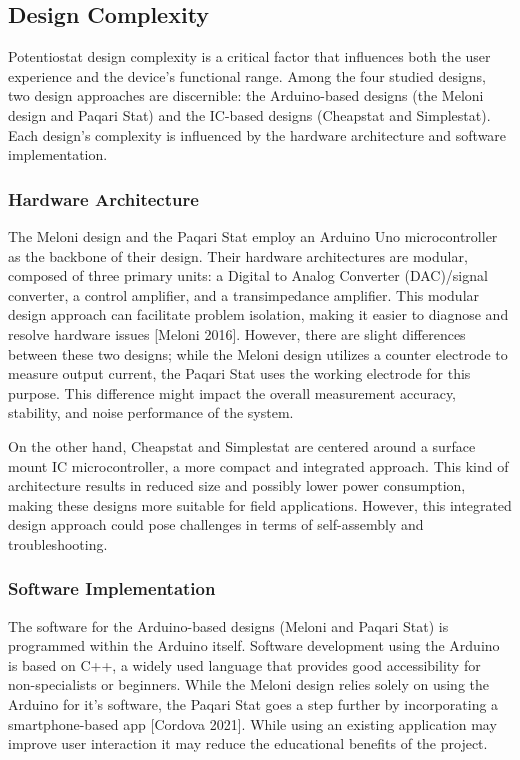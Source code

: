 \documentclass{article}
\begin{document}
\subsection*{Design Complexity}
Potentiostat design complexity is a critical factor that influences both the user experience and the device's functional range. Among the four studied designs, two design approaches are discernible: the Arduino-based designs (the Meloni design and Paqari Stat) and the IC-based designs (Cheapstat and Simplestat). Each design's complexity is influenced by the hardware architecture and software implementation.

\subsubsection*{Hardware Architecture}
The Meloni design and the Paqari Stat employ an Arduino Uno microcontroller as the backbone of their design. Their hardware architectures are modular, composed of three primary units: a Digital to Analog Converter (DAC)/signal converter, a control amplifier, and a transimpedance amplifier. This modular design approach can facilitate problem isolation, making it easier to diagnose and resolve hardware issues [Meloni 2016]. However, there are slight differences between these two designs; while the Meloni design utilizes a counter electrode to measure output current, the Paqari Stat uses the working electrode for this purpose. This difference might impact the overall measurement accuracy, stability, and noise performance of the system. 

On the other hand, Cheapstat and Simplestat are centered around a surface mount IC microcontroller, a more compact and integrated approach. This kind of architecture results in reduced size and possibly lower power consumption, making these designs more suitable for field applications. However, this integrated design approach could pose challenges in terms of self-assembly and troubleshooting.

\subsubsection*{Software Implementation}
The software for the Arduino-based designs (Meloni and Paqari Stat) is programmed within the Arduino itself. Software development using the Arduino is based on C++, a widely used language that provides good accessibility for non-specialists or beginners. While the Meloni design relies solely on using the Arduino for it's software, the Paqari Stat goes a step further by incorporating a smartphone-based app [Cordova 2021]. While using an existing application may improve user interaction it may reduce the educational benefits of the project.
\end{document}
